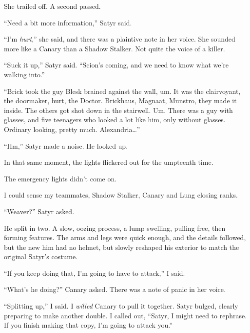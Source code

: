 She trailed off.  A second passed.



``Need a bit more information,'' Satyr said.



``I'm \emph{hurt},'' she said, and there was a plaintive note in her voice.  She sounded more like a Canary than a Shadow Stalker.  Not quite the voice of a killer.



``Suck it up,'' Satyr said.  ``Scion's coming, and we need to know what we're walking into.''



``Brick took the guy Blesk brained against the wall, um.  It was the clairvoyant, the doormaker, hurt, the Doctor.  Brickhaus, Magnaat, Munstro, they made it inside.  The others got shot down in the stairwell.  Um.  There was a guy with glasses, and five teenagers who looked a lot like him, only without glasses.  Ordinary looking, pretty much.  Alexandria\ldots''



``Hm,'' Satyr made a noise.  He looked up.



In that same moment, the lights flickered out for the umpteenth time.



The emergency lights didn't come on.



I could sense my teammates, Shadow Stalker, Canary and Lung closing ranks.



``Weaver?''  Satyr asked.



He split in two.  A slow, oozing process, a lump swelling, pulling free, then forming features.  The arms and legs were quick enough, and the details followed, but the new him had no helmet, but slowly reshaped his exterior to match the original Satyr's costume.



``If you keep doing that, I'm going to have to attack,'' I said.



``What's he doing?''  Canary asked.  There was a note of panic in her voice\emph{.}



``Splitting up,'' I said.  I \emph{willed} Canary to pull it together.  Satyr bulged, clearly preparing to make another double.  I called out, ``Satyr, I might need to rephrase.  If you finish making that copy, I'm going to attack you.''



